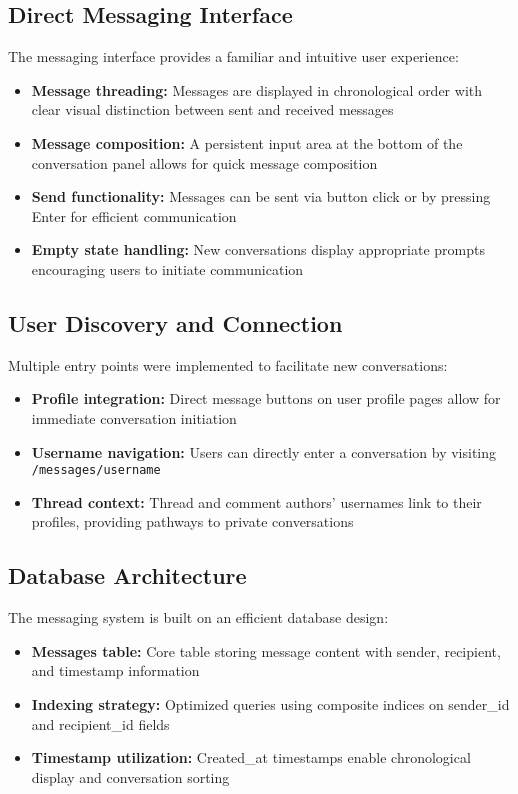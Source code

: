 \documentclass{article}
\begin{document}
\subsection{Direct Messaging Interface}
The messaging interface provides a familiar and intuitive user experience:
\begin{itemize}
    \item \textbf{Message threading:} Messages are displayed in chronological order with clear visual distinction between sent and received messages
    \item \textbf{Message composition:} A persistent input area at the bottom of the conversation panel allows for quick message composition
    \item \textbf{Send functionality:} Messages can be sent via button click or by pressing Enter for efficient communication
    \item \textbf{Empty state handling:} New conversations display appropriate prompts encouraging users to initiate communication
\end{itemize}

\subsection{User Discovery and Connection}
Multiple entry points were implemented to facilitate new conversations:
\begin{itemize}
    \item \textbf{Profile integration:} Direct message buttons on user profile pages allow for immediate conversation initiation
    \item \textbf{Username navigation:} Users can directly enter a conversation by visiting \texttt{/messages/username}
    \item \textbf{Thread context:} Thread and comment authors' usernames link to their profiles, providing pathways to private conversations
\end{itemize}

\subsection{Database Architecture}
The messaging system is built on an efficient database design:
\begin{itemize}
    \item \textbf{Messages table:} Core table storing message content with sender, recipient, and timestamp information
    \item \textbf{Indexing strategy:} Optimized queries using composite indices on sender\_id and recipient\_id fields
    \item \textbf{Timestamp utilization:} Created\_at timestamps enable chronological display and conversation sorting
\end{itemize}
\end{document}
